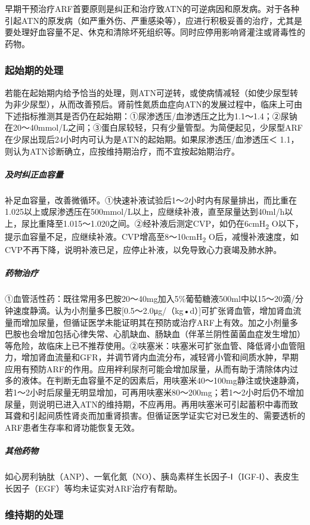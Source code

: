 早期干预治疗ARF首要原则是纠正和治疗致ATN的可逆病因和原发病。对于各种引起ATN的原发病（如严重外伤、严重感染等），应进行积极妥善的治疗，尤其是要处理好血容量不足、休克和清除坏死组织等。同时应停用影响肾灌注或肾毒性的药物。

\subsubsection{起始期的处理}

若能在起始期内给予恰当的处理，则ATN可逆转，或使病情减轻（如使少尿型转为非少尿型），从而改善预后。肾前性氮质血症向ATN的发展过程中，临床上可由下述指标推测其是否仍在起始期：①尿渗透压/血渗透压之比为1.1～1.4；②尿钠在20～40mmol/L之间；③蛋白尿较轻，只有少量管型。为简便起见，少尿型ARF在少尿出现后24小时内可认为是ATN的起始期。如果尿渗透压/血渗透压＜
1.1，则认为ATN诊断确立，应按维持期治疗，而不宜按起始期治疗。

\subparagraph{及时纠正血容量}

补足血容量，改善微循环。①快速补液试验后1～2小时内有尿量排出，而比重在1.025以上或尿渗透压在500mmol/L以上，应继续补液，直至尿量达到40ml/h以上，尿比重降至1.015～1.020之间。②经补液后测定CVP，如仍在6cmH\textsubscript{2}
O以下，提示血容量不足，应继续补液。CVP增高至8～10cmH\textsubscript{2}
O后，减慢补液速度，如CVP不再下降，说明补液已足，应停止补液，以免导致心力衰竭及肺水肿。

\subparagraph{药物治疗}

①血管活性药：既往常用多巴胺20～40mg加入5\%葡萄糖液500ml中以15～20滴/分钟速度静滴。认为小剂量多巴胺{[}0.5～2.0μg/（kg•d）{]}可扩张肾血管，增加肾血流量而增加尿量，但循证医学未能证明其在预防或治疗ARF上有效。加之小剂量多巴胺也会增加包括心律失常、心肌缺血、肠缺血（伴革兰阴性菌菌血症发生增加）等危险，故临床上已不推荐使用。②呋塞米：呋塞米可扩张血管、降低肾小血管阻力，增加肾血流量和GFR，并调节肾内血流分布，减轻肾小管和间质水肿，早期应用有预防ARF的作用。应用袢利尿剂可能会增加尿量，从而有助于清除体内过多的液体。在判断无血容量不足的因素后，用呋塞米40～100mg静注或快速静滴，若1～2小时后尿量无明显增加，可再用呋塞米80～200mg；若1～2小时后仍不增加尿量，则说明已进入ATN的维持期，不应再用。再用呋塞米可引起蓄积中毒而致耳聋和引起间质性肾炎而加重肾损害。但循证医学证实它对已发生的、需要透析的ARF患者生存率和肾功能恢复无效。

\subparagraph{其他药物}

如心房利钠肽（ANP）、一氧化氮（NO）、胰岛素样生长因子-Ⅰ（IGF-Ⅰ）、表皮生长因子（EGF）等均未证实对ARF治疗有帮助。

\subsubsection{维持期的处理}

